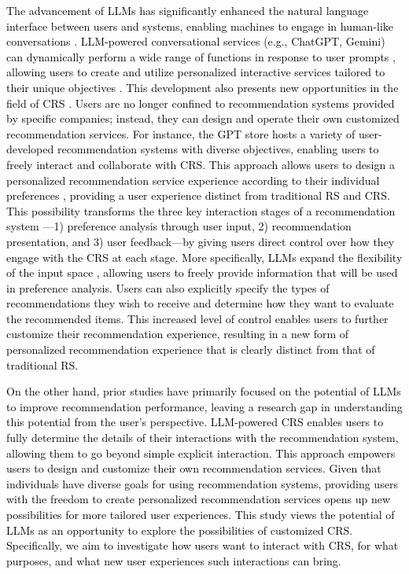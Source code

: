 \textcolor{black}{The advancement of LLMs has significantly enhanced the natural language interface between users and systems, enabling machines to engage in human-like conversations \cite{friedman2023leveraging}. LLM-powered conversational services (e.g., ChatGPT, Gemini) can dynamically perform a wide range of functions in response to user prompts \cite{anelli2024sixth, petruzzelli2024towards, tankelevitch2024metacognitive, deng2023unified}, allowing users to create and utilize personalized interactive services tailored to their unique objectives \cite{kim2019co}. This development also presents new opportunities in the field of CRS \cite{petruzzelli2024towards}. Users are no longer confined to recommendation systems provided by specific companies; instead, they can design and operate their own customized recommendation services. For instance, the GPT store hosts a variety of user-developed recommendation systems with diverse objectives, enabling users to freely interact and collaborate with CRS. This approach allows users to design a personalized recommendation service experience according to their individual preferences \cite{petruzzelli2024towards, friedman2023leveraging}, providing a user experience distinct from traditional RS and CRS. This possibility transforms the three key interaction stages of a recommendation system \cite{pu2012evaluating, harambam2019designing}—1) preference analysis through user input, 2) recommendation presentation, and 3) user feedback—by giving users direct control over how they engage with the CRS at each stage. More specifically, LLMs expand the flexibility of the input space \cite{tankelevitch2024metacognitive}, allowing users to freely provide information that will be used in preference analysis. Users can also explicitly specify the types of recommendations they wish to receive \cite{li2023pbnr, weisz2024design} and determine how they want to evaluate the recommended items. This increased level of control enables users to further customize their recommendation experience, resulting in a new form of personalized recommendation experience that is clearly distinct from that of traditional RS. }

\textcolor{black}{On the other hand, prior studies have primarily focused on the potential of LLMs to improve recommendation performance, leaving a research gap in understanding this potential from the user's perspective. LLM-powered CRS enables users to fully determine the details of their interactions with the recommendation system, allowing them to go beyond simple explicit interaction. This approach empowers users to design and customize their own recommendation services. Given that individuals have diverse goals for using recommendation systems, providing users with the freedom to create personalized recommendation services opens up new possibilities for more tailored user experiences. This study views the potential of LLMs as an opportunity to explore the possibilities of customized CRS. Specifically, we aim to investigate how users want to interact with CRS, for what purposes, and what new user experiences such interactions can bring. }